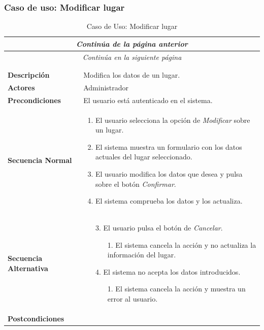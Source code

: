 \subsubsection*{Caso de uso: Modificar lugar }
\begin{longtable}{| p{4cm} | p{10cm} |}
\endfirsthead
\multicolumn{2}{c}{\textit{Continúa de la página anterior}}\\[12pt]
\hline
\endhead
\hline
\multicolumn{2}{c}{\textit{Continúa en la siguiente página}} \\
\endfoot
\hline
\caption{Caso de Uso: Modificar lugar}\label{fig:1}\\
\endlastfoot


\hline
\multicolumn{2}{|c|}{\textbf{CU$<$35$>$ - Modificar Lugar}} \\

\hline
\textbf{Descripción} &
Modifica los datos de un lugar.\\

\hline
\textbf{Actores} &
Administrador\\

\hline
\textbf{Precondiciones} &
El usuario está autenticado en el sistema.\\

\hline
\textbf{Secuencia Normal} &\mbox{}\par\vspace{-\baselineskip}
\begin{enumerate}[leftmargin=0.7cm, topsep=0.1cm]
\item El usuario selecciona la opción de \textit{Modificar} sobre un lugar.
\item El sistema muestra un formulario con los datos actuales del lugar seleccionado.
\item El usuario modifica los datos que desea y pulsa sobre el botón \textit{Confirmar}.
\item El sistema comprueba los datos y los actualiza.
\end{enumerate}


\\
\hline
\textbf{Secuencia Alternativa} &\mbox{}\par\vspace{-\baselineskip}
\begin{enumerate}[leftmargin=0.9cm, topsep=0.1cm]
\item[3.] El usuario pulsa el botón de \textit{Cancelar}.
	\begin{itemize}
	\item[1.] El sistema cancela la acción y no actualiza la información del lugar.
	\end{itemize}
\item[4.] El sistema no acepta los datos introducidos.
	\begin{itemize}
	\item[1.] El sistema cancela la acción y muestra un error al usuario.
	\end{itemize}
\end{enumerate}
\\

\hline
\textbf{Postcondiciones} & \\
\hline
\end{longtable}



